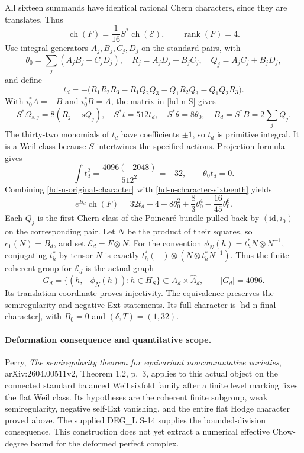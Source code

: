 All sixteen summands have identical rational Chern characters, since
they are translates. Thus
\begin{equation}\label{hd-n-character-sixteenth}
 \operatorname{ch}(F)=\frac1{16}S^*\operatorname{ch}(\mathcal E),
 \qquad \operatorname{rank}(F)=4.
\end{equation}
Use integral generators $A_j,B_j,C_j,D_j$ on the standard pairs, with
\[
 \theta_0=\sum_j(A_jB_j+C_jD_j),\quad
 R_j=A_jD_j-B_jC_j,\quad Q_j=A_jC_j+B_jD_j,
\]
and define
\begin{equation}\label{hd-n-standard-weil}
 t_d=-\bigl(R_1R_2R_3-R_1Q_2Q_3-Q_1R_2Q_3-Q_1Q_2R_3\bigr).
\end{equation}
With $i_0^*A=-B$ and $i_0^*B=A$, the matrix in
\eqref{hd-n-S} gives
\[
 S^*\Omega_{s,j}=8(R_j-sQ_j),\quad S^*t=512t_d,\quad
 S^*\theta=8\theta_0,\quad B_d=S^*B=2\sum_jQ_j.
\]
The thirty-two monomials of $t_d$ have coefficients $\pm1$, so $t_d$
is primitive integral. It is a Weil class because $S$ intertwines the
specified actions. Projection formula gives
\[
 \int t_d^2=\frac{4096(-2048)}{512^2}=-32,\qquad
 \theta_0t_d=0.
\]
Combining \eqref{hd-n-original-character} with
\eqref{hd-n-character-sixteenth} yields
\[
 e^{B_d}\operatorname{ch}(F)
 =32t_d+4-8\theta_0^2+\frac83\theta_0^4-\frac{16}{45}\theta_0^6.
\]
Each $Q_j$ is the first Chern class of the Poincar\'e bundle pulled
back by $(\mathrm{id},i_0)$ on the corresponding pair. Let $N$ be the
product of their squares, so $c_1(N)=B_d$, and set
$\mathcal E_d=F\otimes N$.
For the convention $\phi_N(h)=t_h^*N\otimes N^{-1}$, conjugating
$t_h^*$ by tensor $N$ is exactly
$t_h^*(-)\otimes(N\otimes t_h^*N^{-1})$. Thus the finite coherent
group for $\mathcal E_d$ is the actual graph
\[
 G_d=\{(h,-\phi_N(h)):h\in H_S\}\subset A_d\times\widehat A_d,
 \qquad |G_d|=4096.
\]
Its translation coordinate proves injectivity. The equivalence preserves
the semiregularity and negative-Ext statements. Its full character is
\eqref{hd-n-final-character}, with $B_0=0$ and $(\delta,T)=(1,32)$.

\paragraph{Deformation consequence and quantitative scope.}
Perry, \emph{The semiregularity theorem for equivariant noncommutative
varieties}, arXiv:2604.00511v2, Theorem 1.2, p.~3, applies to this
actual object on the connected standard balanced Weil sixfold family
after a finite level marking fixes the flat Weil class. Its hypotheses
are the coherent finite subgroup, weak semiregularity, negative
self-Ext vanishing, and the entire flat Hodge character proved above.
The supplied DEG\_L S-14 supplies the bounded-division consequence.
This construction does not yet extract a numerical effective
Chow-degree bound for the deformed perfect complex.

